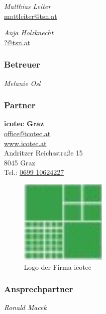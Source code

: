 \emph{Matthias Leiter} \\
\href{mailto:mattleiter@tsn.at}{mattleiter@tsn.at} 
\begin{figure}
\end{figure}

\emph{Anja Holzknecht} \\
\href{mailto:anjholzknecht@tsn.at}{?@tsn.at} 
\begin{figure}
\end{figure}

\subsubsection{Betreuer}
\emph{Melanie Osl}

\subsubsection{Partner}
\textbf{icotec Graz} \\
\href{mailto:office@icotec.at}{office@icotec.at} \\
\href{www.icotec.at}{www.icotec.at} \\
Andritzer Reichsstraße 15 \\
8045 Graz \\
Tel.: \href{tel:069910624227}{0699 10624227}
\begin{figure}[H]
	\captionsetup{singlelinecheck = false, format= hang, justification=raggedright, font=footnotesize, labelsep=space}
	\includegraphics{Logo_Projektpartner.png}
	\caption{Logo der Firma icotec}
	\label{fig:LogoProjektpartner}
\end{figure}

\subsubsection{Ansprechpartner}
\emph {Ronald Macek}
\begin{figure}
\end{figure}


